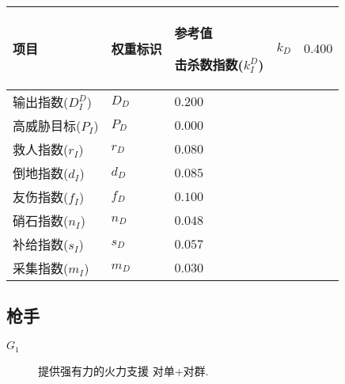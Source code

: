 \documentclass{ctexart}
\begin{document}
\begin{longtable}{|>{\centering\arraybackslash}p{8em}|>{\centering\arraybackslash}p{4em}|>{\centering\arraybackslash}p{6em}|}
    \hline

    项目             & 权重标识  & 参考值     \endhead

    \hline

    击杀数指数($k_I^D$) & $k_D$ & $0.400$          \\

    \hline

    输出指数($D_I^D$)  & $D_D$ & $0.200$          \\

    \hline

    高威胁目标($P_I$)   & $P_D$ & $0.000$          \\

    \hline

    救人指数($r_I$)    & $r_D$ & $0.080$          \\

    \hline

    倒地指数($d_I$)    & $d_D$ & $0.085$          \\

    \hline

    友伤指数($f_I$)    & $f_D$ & $0.100$          \\

    \hline

    硝石指数($n_I$)    & $n_D$ & $0.048$          \\

    \hline

    补给指数($s_I$)    & $s_D$ & $0.057$          \\

    \hline

    采集指数($m_I$)    & $m_D$ & $0.030$          \\

    \hline
\end{longtable}


\subsection{枪手}

\begin{description}
    \item[$G_1$] 提供强有力的火力支援\cite{tieba-all}\cite{xiaoheihe-all} 对单+对群\cite{tieba-all}.
\end{description}
\end{document}

